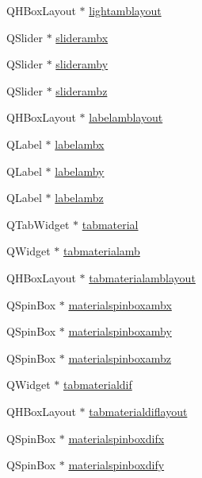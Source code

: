 \begin{DoxyCompactItemize}
\item 
Q\+H\+Box\+Layout $\ast$ \hyperlink{class_mondock_ada46a57b4e681dc6f9420ae74f46fefc}{lightamblayout}
\item 
Q\+Slider $\ast$ \hyperlink{class_mondock_a51c280e3a1dae1f368e9028069afb424}{sliderambx}
\item 
Q\+Slider $\ast$ \hyperlink{class_mondock_ac6a5fbe64fd9a0567ae84e9ec5244fbd}{slideramby}
\item 
Q\+Slider $\ast$ \hyperlink{class_mondock_aa90503d09eeebd2f51e15a416c6424c7}{sliderambz}
\item 
Q\+H\+Box\+Layout $\ast$ \hyperlink{class_mondock_a8726f8f74256a666684740d03747ad5a}{labelamblayout}
\item 
Q\+Label $\ast$ \hyperlink{class_mondock_af77614bc15448c7488db1b12a03162f5}{labelambx}
\item 
Q\+Label $\ast$ \hyperlink{class_mondock_a467e81ae77fc44ddd9785214c64ae443}{labelamby}
\item 
Q\+Label $\ast$ \hyperlink{class_mondock_a59965e3362191562ca427aaafbffb67f}{labelambz}
\item 
Q\+Tab\+Widget $\ast$ \hyperlink{class_mondock_a85429c5714bc04dc5866983a9659f723}{tabmaterial}
\item 
Q\+Widget $\ast$ \hyperlink{class_mondock_a5b0d6245de8e0e70d7552ad035295793}{tabmaterialamb}
\item 
Q\+H\+Box\+Layout $\ast$ \hyperlink{class_mondock_a768206ca1e41a57f687e6bbbdaca3a9a}{tabmaterialamblayout}
\item 
Q\+Spin\+Box $\ast$ \hyperlink{class_mondock_a4efb6643d3bea5ac601770ed2e3b3290}{materialspinboxambx}
\item 
Q\+Spin\+Box $\ast$ \hyperlink{class_mondock_a52f12188582ccf1488a2f5f2059ec304}{materialspinboxamby}
\item 
Q\+Spin\+Box $\ast$ \hyperlink{class_mondock_a24725d21ed105e3d2fc2c2360c2581a6}{materialspinboxambz}
\item 
Q\+Widget $\ast$ \hyperlink{class_mondock_a1d05427fb146c04086803be70153d868}{tabmaterialdif}
\item 
Q\+H\+Box\+Layout $\ast$ \hyperlink{class_mondock_a346764281a416f9221d71a96cf9ce4fc}{tabmaterialdiflayout}
\item 
Q\+Spin\+Box $\ast$ \hyperlink{class_mondock_abf580ff2de20747ff28cb3af69aec147}{materialspinboxdifx}
\item 
Q\+Spin\+Box $\ast$ \hyperlink{class_mondock_ab1c4bb9e29202b1fcb3d4f2f2f7112a8}{materialspinboxdify}
\item 

\end{DoxyCompactItemize}
